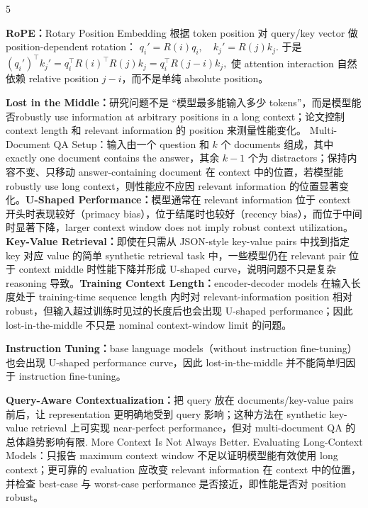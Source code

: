 \documentclass[a4paper, landscape]{article}
\begin{document}
\begin{multicols}{5}
\par \textbf{RoPE：}Rotary Position Embedding 根据 token position 对 query/key vector 做 position-dependent rotation：
\(
q_i'=R(i)q_i,\quad k_j'=R(j)k_j.
\)
于是
\(
(q_i')^\top k_j'
=
q_i^\top R(i)^\top R(j)k_j
=
q_i^\top R(j-i)k_j,
\)
使 attention interaction 自然依赖 relative position \(j-i\)，而不是单纯 absolute position。

\par \textbf{Lost in the Middle：}研究问题不是 ``模型最多能输入多少 tokens''，而是模型能否robustly use information at arbitrary positions in a long context；论文控制 context length 和 relevant information 的 position 来测量性能变化。 Multi-Document QA Setup：输入由一个 question 和 \(k\) 个 documents 组成，其中 exactly one document contains the answer，其余 \(k-1\) 个为 distractors；保持内容不变、只移动 answer-containing document 在 context 中的位置，若模型能 robustly use long context，则性能应不应因 relevant information 的位置显著变化。\textbf{U-Shaped Performance：}模型通常在 relevant information 位于 context 开头时表现较好（primacy bias），位于结尾时也较好（recency bias），而位于中间时显著下降，larger context window does not imply robust context utilization。\textbf{Key-Value Retrieval：}即使在只需从 JSON-style key-value pairs 中找到指定 key 对应 value 的简单 synthetic retrieval task 中，一些模型仍在 relevant pair 位于 context middle 时性能下降并形成 U-shaped curve，说明问题不只是复杂 reasoning 导致。\textbf{Training Context Length：}encoder-decoder models 在输入长度处于 training-time sequence length 内时对 relevant-information position 相对 robust，但输入超过训练时见过的长度后也会出现 U-shaped performance；因此 lost-in-the-middle 不只是 nominal context-window limit 的问题。

\par \textbf{Instruction Tuning：}base language models（without instruction fine-tuning）也会出现 U-shaped performance curve，因此 lost-in-the-middle 并不能简单归因于 instruction fine-tuning。

\par \textbf{Query-Aware Contextualization：}把 query 放在 documents/key-value pairs 前后，让 representation 更明确地受到 query 影响；这种方法在 synthetic key-value retrieval 上可实现 near-perfect performance，但对 multi-document QA 的总体趋势影响有限. More Context Is Not Always Better. Evaluating Long-Context Models：只报告 maximum context window 不足以证明模型能有效使用 long context；更可靠的 evaluation 应改变 relevant information 在 context 中的位置，并检查 best-case 与 worst-case performance 是否接近，即性能是否对 position robust。


\end{multicols}
\end{document}

